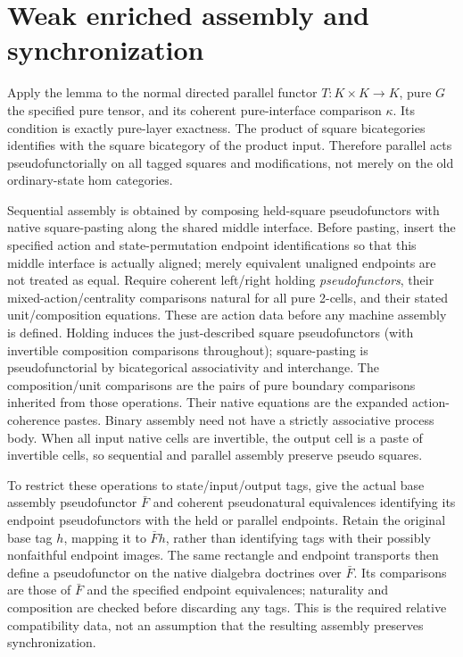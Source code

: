 \documentclass{article}
\begin{document}
\section{Weak enriched assembly and synchronization}
Apply the lemma to the normal directed parallel functor $T:K\times K\to K$, pure $G$ the specified pure tensor, and its coherent pure-interface comparison $\kappa$. Its condition is exactly pure-layer exactness. The product of square bicategories identifies with the square bicategory of the product input. Therefore parallel acts pseudofunctorially on all tagged squares and modifications, not merely on the old ordinary-state hom categories.

Sequential assembly is obtained by composing held-square pseudofunctors with native square-pasting along the shared middle interface. Before pasting, insert the specified action and state-permutation endpoint identifications so that this middle interface is actually aligned; merely equivalent unaligned endpoints are not treated as equal. Require coherent left/right holding \emph{pseudofunctors}, their mixed-action/centrality comparisons natural for all pure 2-cells, and their stated unit/composition equations. These are action data before any machine assembly is defined. Holding induces the just-described square pseudofunctors (with invertible composition comparisons throughout); square-pasting is pseudofunctorial by bicategorical associativity and interchange. The composition/unit comparisons are the pairs of pure boundary comparisons inherited from those operations. Their native equations are the expanded action-coherence pastes. Binary assembly need not have a strictly associative process body. When all input native cells are invertible, the output cell is a paste of invertible cells, so sequential and parallel assembly preserve pseudo squares.

To restrict these operations to state/input/output tags, give the actual base assembly pseudofunctor $\bar F$ and coherent pseudonatural equivalences identifying its endpoint pseudofunctors with the held or parallel endpoints. Retain the original base tag $h$, mapping it to $\bar Fh$, rather than identifying tags with their possibly nonfaithful endpoint images. The same rectangle and endpoint transports then define a pseudofunctor on the native dialgebra doctrines over $\bar F$. Its comparisons are those of $\bar F$ and the specified endpoint equivalences; naturality and composition are checked before discarding any tags. This is the required relative compatibility data, not an assumption that the resulting assembly preserves synchronization.
\end{document}
